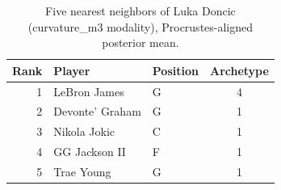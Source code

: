 \begin{table}[htbp]
  \centering\small
  \begin{tabular}{rllc}
    \toprule
    Rank & Player & Position & Archetype \\
    \midrule
    1 & LeBron James & G & 4 \\
    2 & Devonte' Graham & G & 1 \\
    3 & Nikola Jokic & C & 1 \\
    4 & GG Jackson II & F & 1 \\
    5 & Trae Young & G & 1 \\
    \bottomrule
  \end{tabular}
  \caption{Five nearest neighbors of Luka Doncic (curvature_m3 modality), Procrustes-aligned posterior mean.}
  \label{tab:Luka_Doncic_neighbors_curvature_m3}
\end{table}

